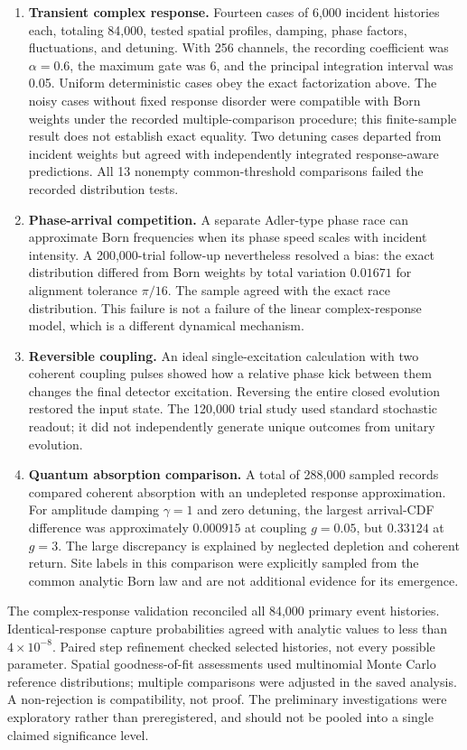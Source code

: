 \documentclass[11pt]{article}
\begin{document}
\begin{enumerate}
\item \textbf{Transient complex response.} Fourteen cases of 6,000 incident histories each, totaling 84,000, tested spatial profiles, damping, phase factors, fluctuations, and detuning. With 256 channels, the recording coefficient was $\alpha=0.6$, the maximum gate was 6, and the principal integration interval was 0.05. Uniform deterministic cases obey the exact factorization above. The noisy cases without fixed response disorder were compatible with Born weights under the recorded multiple-comparison procedure; this finite-sample result does not establish exact equality. Two detuning cases departed from incident weights but agreed with independently integrated response-aware predictions. All 13 nonempty common-threshold comparisons failed the recorded distribution tests.
\item \textbf{Phase-arrival competition.} A separate Adler-type phase race can approximate Born frequencies when its phase speed scales with incident intensity. A 200,000-trial follow-up nevertheless resolved a bias: the exact distribution differed from Born weights by total variation $0.01671$ for alignment tolerance $\pi/16$. The sample agreed with the exact race distribution. This failure is not a failure of the linear complex-response model, which is a different dynamical mechanism.
\item \textbf{Reversible coupling.} An ideal single-excitation calculation with two coherent coupling pulses showed how a relative phase kick between them changes the final detector excitation. Reversing the entire closed evolution restored the input state. The 120,000 trial study used standard stochastic readout; it did not independently generate unique outcomes from unitary evolution.
\item \textbf{Quantum absorption comparison.} A total of 288,000 sampled records compared coherent absorption with an undepleted response approximation. For amplitude damping $\gamma=1$ and zero detuning, the largest arrival-CDF difference was approximately $0.000915$ at coupling $g=0.05$, but $0.33124$ at $g=3$. The large discrepancy is explained by neglected depletion and coherent return. Site labels in this comparison were explicitly sampled from the common analytic Born law and are not additional evidence for its emergence.
\end{enumerate}

The complex-response validation reconciled all 84,000 primary event histories. Identical-response capture probabilities agreed with analytic values to less than $4\times10^{-8}$. Paired step refinement checked selected histories, not every possible parameter. Spatial goodness-of-fit assessments used multinomial Monte Carlo reference distributions; multiple comparisons were adjusted in the saved analysis. A non-rejection is compatibility, not proof. The preliminary investigations were exploratory rather than preregistered, and should not be pooled into a single claimed significance level.
\end{document}
